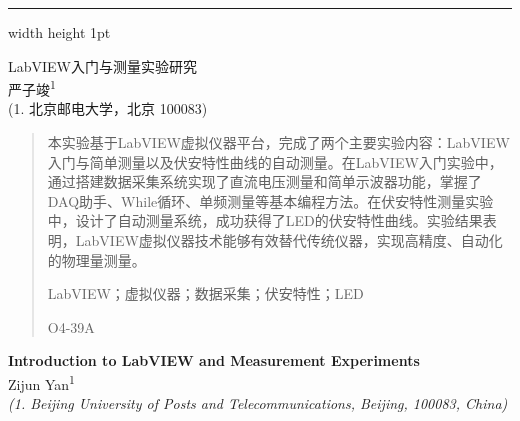 \documentclass[12pt,a4paper]{article}
\begin{document}
\thispagestyle{firstpage}

\vspace*{-2cm}
\hrule width \textwidth height 1pt
\vspace{1.5cm}

\begin{center}
    {\heiti LabVIEW入门与测量实验研究} \\[0.5\baselineskip]

    {\kaishu 严子竣\textsuperscript{1}} \\[0.3\baselineskip]

    {\kaishu (1. 北京邮电大学，北京 100083)} \\[0.5\baselineskip]
\end{center}

\begin{quote}
    \songti
    \setlength{\leftskip}{2em}
    \setlength{\rightskip}{2em}

    本实验基于LabVIEW虚拟仪器平台，完成了两个主要实验内容：LabVIEW入门与简单测量以及伏安特性曲线的自动测量。在LabVIEW入门实验中，通过搭建数据采集系统实现了直流电压测量和简单示波器功能，掌握了DAQ助手、While循环、单频测量等基本编程方法。在伏安特性测量实验中，设计了自动测量系统，成功获得了LED的伏安特性曲线。实验结果表明，LabVIEW虚拟仪器技术能够有效替代传统仪器，实现高精度、自动化的物理量测量。

    \vspace{0.5\baselineskip}
    LabVIEW；虚拟仪器；数据采集；伏安特性；LED

    O4-39A
\end{quote}

\vspace{1cm}

\begin{center}
    {\fontsize{15}{18}\selectfont\bfseries Introduction to LabVIEW and Measurement Experiments} \\[0.3\baselineskip]

    {\fontsize{10.5}{12.6}\selectfont Zijun Yan\textsuperscript{1}} \\[0.3\baselineskip]

    {\fontsize{9}{10.8}\selectfont\itshape (1. Beijing University of Posts and Telecommunications, Beijing, 100083, China)} \\[0.5\baselineskip]
\end{center}
\end{document}
